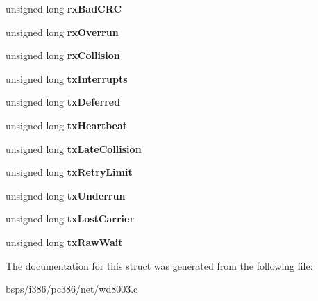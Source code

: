 \begin{DoxyCompactItemize}
\item 
\mbox{\label{structwd__softc_ab428be43446a21e53d30e07736fbe8a7}} 
unsigned long {\bfseries rx\+Bad\+C\+RC}
\item 
\mbox{\label{structwd__softc_a89c6a6dd857a186b0014c2777b59ef93}} 
unsigned long {\bfseries rx\+Overrun}
\item 
\mbox{\label{structwd__softc_afca0f84a622b5c8f1fcb318e60ab5211}} 
unsigned long {\bfseries rx\+Collision}
\item 
\mbox{\label{structwd__softc_ab35d1bdcd987b53e0cc955da85e94095}} 
unsigned long {\bfseries tx\+Interrupts}
\item 
\mbox{\label{structwd__softc_a70157b1be2118fa064cdbf23b39d9918}} 
unsigned long {\bfseries tx\+Deferred}
\item 
\mbox{\label{structwd__softc_ac68220846f4378ccc0fdbcb1c6430ed3}} 
unsigned long {\bfseries tx\+Heartbeat}
\item 
\mbox{\label{structwd__softc_a23395783a49160d2f3b725f96c98b528}} 
unsigned long {\bfseries tx\+Late\+Collision}
\item 
\mbox{\label{structwd__softc_aaf3019045553a58cc742f49a404f436e}} 
unsigned long {\bfseries tx\+Retry\+Limit}
\item 
\mbox{\label{structwd__softc_a89b06f020ac6401025c1c9bb44ddd717}} 
unsigned long {\bfseries tx\+Underrun}
\item 
\mbox{\label{structwd__softc_a9ee5d897ac737ef67927d5649f60efbc}} 
unsigned long {\bfseries tx\+Lost\+Carrier}
\item 
\mbox{\label{structwd__softc_a86d8510a41b44e112a2e9ee5bfb57951}} 
unsigned long {\bfseries tx\+Raw\+Wait}
\end{DoxyCompactItemize}


The documentation for this struct was generated from the following file\+:\begin{DoxyCompactItemize}
\item 
bsps/i386/pc386/net/wd8003.\+c\end{DoxyCompactItemize}
